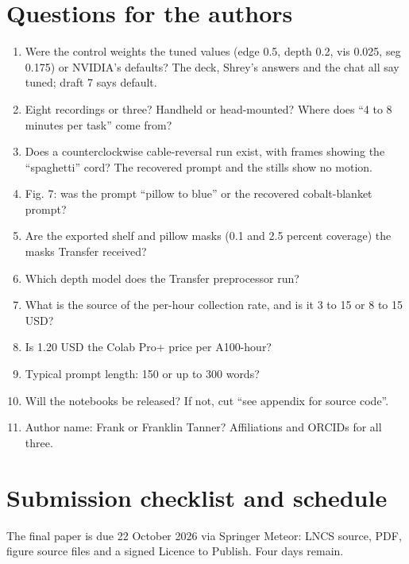 \documentclass[
  11pt,
]{article}
\providecommand{\tightlist}{%
  \setlength{\itemsep}{0pt}\setlength{\parskip}{0pt}}
\begin{document}
\section{Questions for the authors}\label{questions-for-the-authors}

\begin{enumerate}
\def\labelenumi{\arabic{enumi}.}
\tightlist
\item
  Were the control weights the tuned values (edge 0.5, depth 0.2, vis
  0.025, seg 0.175) or NVIDIA's defaults? The deck, Shrey's answers and
  the chat all say tuned; draft 7 says default.
\item
  Eight recordings or three? Handheld or head-mounted? Where does ``4 to
  8 minutes per task'' come from?
\item
  Does a counterclockwise cable-reversal run exist, with frames showing
  the ``spaghetti'' cord? The recovered prompt and the stills show no
  motion.
\item
  Fig. 7: was the prompt ``pillow to blue'' or the recovered
  cobalt-blanket prompt?
\item
  Are the exported shelf and pillow masks (0.1 and 2.5 percent coverage)
  the masks Transfer received?
\item
  Which depth model does the Transfer preprocessor run?
\item
  What is the source of the per-hour collection rate, and is it 3 to 15
  or 8 to 15 USD?
\item
  Is 1.20 USD the Colab Pro+ price per A100-hour?
\item
  Typical prompt length: 150 or up to 300 words?
\item
  Will the notebooks be released? If not, cut ``see appendix for source
  code''.
\item
  Author name: Frank or Franklin Tanner? Affiliations and ORCIDs for all
  three.
\end{enumerate}

\section{Submission checklist and
schedule}\label{submission-checklist-and-schedule}

The final paper is due 22 October 2026 via Springer Meteor: LNCS source,
PDF, figure source files and a signed Licence to Publish. Four days
remain.
\end{document}
